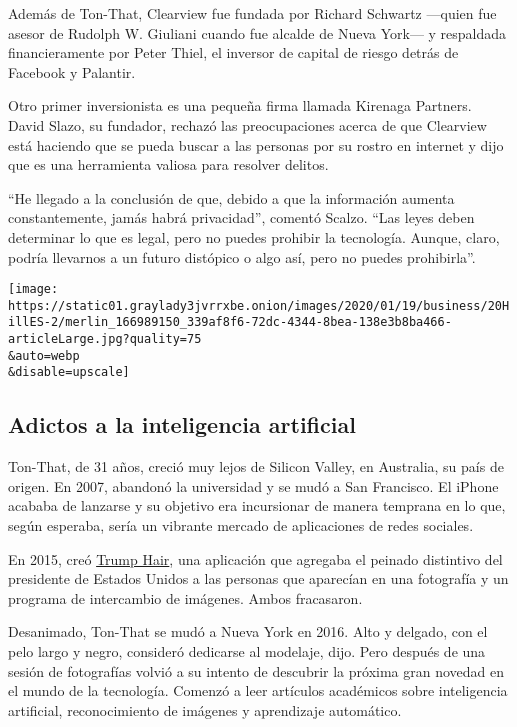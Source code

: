 Además de Ton-That, Clearview fue fundada por Richard Schwartz ---quien
fue asesor de Rudolph W. Giuliani cuando fue alcalde de Nueva York--- y
respaldada financieramente por Peter Thiel, el inversor de capital de
riesgo detrás de Facebook y Palantir.

Otro primer inversionista es una pequeña firma llamada Kirenaga
Partners. David Slazo, su fundador, rechazó las preocupaciones acerca de
que Clearview está haciendo que se pueda buscar a las personas por su
rostro en internet y dijo que es una herramienta valiosa para resolver
delitos.

``He llegado a la conclusión de que, debido a que la información aumenta
constantemente, jamás habrá privacidad'', comentó Scalzo. ``Las leyes
deben determinar lo que es legal, pero no puedes prohibir la tecnología.
Aunque, claro, podría llevarnos a un futuro distópico o algo así, pero
no puedes prohibirla''.

\texttt{[image: https://static01.graylady3jvrrxbe.onion/images/2020/01/19/business/20HillES-2/merlin\_166989150\_339af8f6-72dc-4344-8bea-138e3b8ba466-articleLarge.jpg?quality=75\\\&auto=webp\\\&disable=upscale]}

\hypertarget{adictos-a-la-inteligencia-artificial}{%
\subsection{Adictos a la inteligencia
artificial}\label{adictos-a-la-inteligencia-artificial}}

Ton-That, de 31 años, creció muy lejos de Silicon Valley, en Australia,
su país de origen. En 2007, abandonó la universidad y se mudó a San
Francisco. El iPhone acababa de lanzarse y su objetivo era incursionar
de manera temprana en lo que, según esperaba, sería un vibrante mercado
de aplicaciones de redes sociales.

En 2015, creó \href{https://www.148apps.com/app/1040750174/}{Trump
Hair}, una aplicación que agregaba el peinado distintivo del presidente
de Estados Unidos a las personas que aparecían en una fotografía y un
programa de intercambio de imágenes. Ambos fracasaron.

Desanimado, Ton-That se mudó a Nueva York en 2016. Alto y delgado, con
el pelo largo y negro, consideró dedicarse al modelaje, dijo. Pero
después de una sesión de fotografías volvió a su intento de descubrir la
próxima gran novedad en el mundo de la tecnología. Comenzó a leer
artículos académicos sobre inteligencia artificial, reconocimiento de
imágenes y aprendizaje automático.

